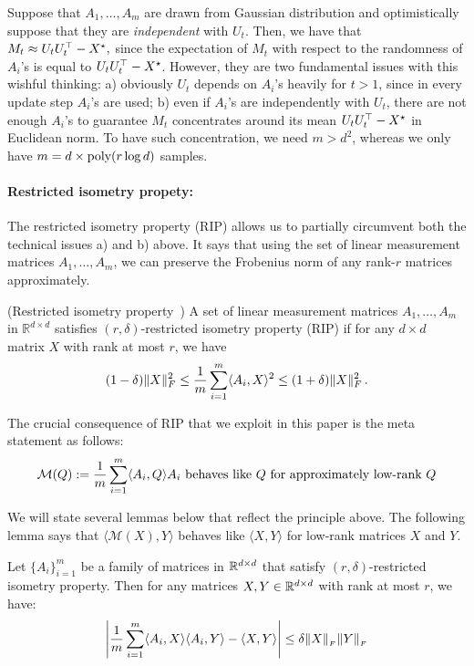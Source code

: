 Suppose that $A_1,\dots, A_m$ are drawn from Gaussian distribution and  optimistically suppose that they are \textit{independent} with $U_t$. Then, we have that $M_t \approx U_tU_t^\top - {X}^\star, $ since the expectation of $M_t$ with respect to the randomness of $A_i$'s is equal to $U_tU_t^\top - {X}^\star$. However, they are two fundamental issues with this wishful thinking: a) obviously $U_t$ depends on $A_i$'s heavily for $t> 1$, since in every update step $A_i$'s are used; b) even if $A_i$'s are independently with $U_t$, there are not enough $A_i$'s to guarantee $M_t$ concentrates around its mean $U_tU_t^\top - {X}^\star$ in Euclidean norm. To have such concentration, we need $m > d^2$, whereas we only have $m = d \times \textup{poly}(r \log d)$ samples. 


\paragraph{Restricted isometry propety:} The restricted isometry property (RIP) allows us to partially circumvent both the technical issues a) and b) above. It says that using the set of linear measurement matrices $A_1,\dots, A_m$, we can preserve the Frobenius norm of any rank-$r$ matrices approximately.


\begin{defn}\label{def:rip}(Restricted isometry property~\cite{recht2010guaranteed})  A set of linear measurement matrices  $A_1,\dots, A_m$ in $\mathbb{R}^{d\times d}$ satisfies $(r,\delta)$-restricted isometry property (RIP) if for any $d\times d$ matrix $X$ with rank at most $r$, we have
	\begin{align}
	(1-\delta)\|X\|_F^2 \le \frac{1}{m}\sum_{i = 1}^m \langle A_i, X \rangle^2 \leq (1+\delta)\|X\|_F^2 \,. \label{eqn:RIP}
	\end{align}
\end{defn}
\noindent The crucial consequence of RIP that we exploit in this paper is the meta statement as follows: 
\begin{align}
\textup{$\mathcal{M}(Q) := \frac{1}{m}\sum_{i = 1}^m\langle {A}_i, Q \rangle{A}_i$ behaves like $Q$ for approximately low-rank $Q$} \label{eqn:meta}\end{align}

\noindent We will state several lemmas below that reflect the principle above. The following lemma says that $\langle\mathcal{M}(X), Y\rangle$ behaves like $\langle X, Y\rangle$ for low-rank matrices $X$ and $Y$. 

\begin{lem}\cite[Lemma 2.1]{candes2008RIP}\label{lem:RIP3}
	Let $\{ A_i \}_{i=1}^m$ be a family of matrices in $\mathbb{R}^{d \times d}$
	that satisfy $(r, \delta)$-restricted isometry property.
	Then for any matrices $X, Y \in \mathbb{R}^{d \times d}$ with rank at most $r$,
	we have:
	\[ \left|{\frac 1 m \sum_{i=1}^m \langle A_i, X\rangle \langle A_i, Y\rangle    - \langle X, Y\rangle }\right|
	\le \delta \|X\|_{_{F}} \|Y\|_{_{F}} \]
\end{lem}

